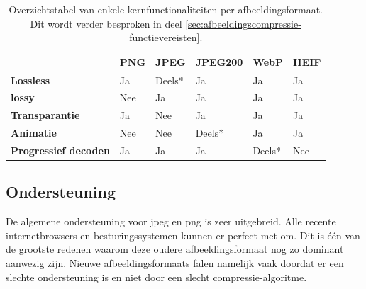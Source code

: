 \begin{table}[]
	\begin{tabular}{|l|l|l|l|l|l|}
		\hline
		& \textbf{PNG}                   & \textbf{JPEG}                  & \textbf{JPEG200}               & \textbf{WebP}                  & \textbf{HEIF}               \\ \hline
		\textbf{Lossless}            & \cellcolor[HTML]{32CB00}Ja     & \cellcolor[HTML]{9B9B9B}Deels* & \cellcolor[HTML]{32CB00}Ja     & \cellcolor[HTML]{32CB00}Ja     & \cellcolor[HTML]{32CB00}Ja  \\ \hline
		\textbf{lossy}               & \cellcolor[HTML]{CB0000}Nee    & \cellcolor[HTML]{32CB00}Ja     & \cellcolor[HTML]{32CB00}Ja     & \cellcolor[HTML]{32CB00}Ja     & \cellcolor[HTML]{32CB00}Ja  \\ \hline
		\textbf{Transparantie}       & \cellcolor[HTML]{32CB00}Ja     & \cellcolor[HTML]{CB0000}Nee    & \cellcolor[HTML]{32CB00}Ja     & \cellcolor[HTML]{32CB00}Ja     & \cellcolor[HTML]{32CB00}Ja  \\ \hline
		\textbf{Animatie}            & \cellcolor[HTML]{CB0000}Nee  & \cellcolor[HTML]{CB0000}Nee    & \cellcolor[HTML]{9B9B9B}Deels* & \cellcolor[HTML]{32CB00}Ja     & \cellcolor[HTML]{32CB00}Ja  \\ \hline
		\textbf{Progressief decoden} & \cellcolor[HTML]{32CB00}Ja     & \cellcolor[HTML]{32CB00}Ja     & \cellcolor[HTML]{32CB00}Ja     & \cellcolor[HTML]{9B9B9B}Deels* & \cellcolor[HTML]{CB0000}Nee \\ \hline
	\end{tabular}
	\caption{Overzichtstabel van enkele kernfunctionaliteiten per \gls{afbeeldingsformaat}. Dit wordt verder besproken in deel \ref{sec:afbeeldingscompressie-functievereisten}.}
	\label{fig:overzichtstabel-afbeeldingsformaten-functies}
\end{table}

\subsection{Ondersteuning}
\label{sec:afbeeldingscompressie-ondersteuning}

De algemene ondersteuning voor \gls{jpeg} en \gls{png} is zeer uitgebreid. Alle recente internetbrowsers en besturingssystemen kunnen er perfect met om. Dit is één van de grootste redenen waarom deze oudere \gls{afbeeldingsformaat} nog zo dominant aanwezig zijn. Nieuwe \glspl{afbeeldingsformaat} falen namelijk vaak doordat er een slechte ondersteuning is en niet door een slecht \gls{compressie-algoritme}.

